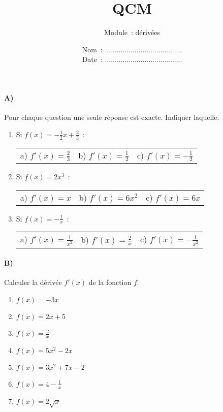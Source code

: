 \documentclass[a4paper]{article}
\begin{document}
  \title{QCM}
  \author{Module~: dérivées}
  \date{
    Nom~: .......................................\\
    \vspace{0.2cm}
    Date~: .......................................}
  \maketitle
  
  \paragraph{A)}
  Pour chaque question une seule réponse est exacte. Indiquer laquelle.
  \begin{enumerate}
    \item
      Si $\displaystyle f(x) = - \frac{1}{2} x + \frac{2}{3}$~:
      \begin{center}
        \begin{tabular}{p{3cm}p{3cm}p{3cm}}
          a) $\displaystyle f'(x) = \frac{2}{3}$ & b) $\displaystyle f'(x) = \frac{1}{2}$ & c) $\displaystyle f'(x) = - \frac{1}{2}$
        \end{tabular}
      \end{center}

    \item
      Si $f(x) = 2 x^3$~:
      \begin{center}
        \begin{tabular}{p{3cm}p{3cm}p{3cm}}
          a) $f'(x) = x$ & b) $f'(x) = 6 x^2$ & c) $f'(x) = 6x$
        \end{tabular}
      \end{center}

    \item
      Si $\displaystyle f(x) = - \frac{1}{x}$~:
      \begin{center}
        \begin{tabular}{p{3cm}p{3cm}p{3cm}}
          a) $\displaystyle f'(x) = \frac{1}{x^2}$ & b) $\displaystyle f'(x) = \frac{2}{x}$ & c) $\displaystyle f'(x) = - \frac{1}{x^2}$
        \end{tabular}
      \end{center}
  \end{enumerate}

  \paragraph{B)}
  Calculer la dérivée $f'(x)$ de la fonction $f$.
  \begin{enumerate}
    \item $f(x) = - 3 x$
    \item $f(x) = 2x + 5$
    \item $\displaystyle f(x) = \frac{2}{x}$
    \item $f(x) = 5 x^2 - 2x$
    \item $f(x) = 3 x^2 + 7x - 2$
    \item $\displaystyle f(x) = 4 - \frac{1}{x}$
    \item $f(x) = 2 \sqrt{x}$
  \end{enumerate}
\end{document}
